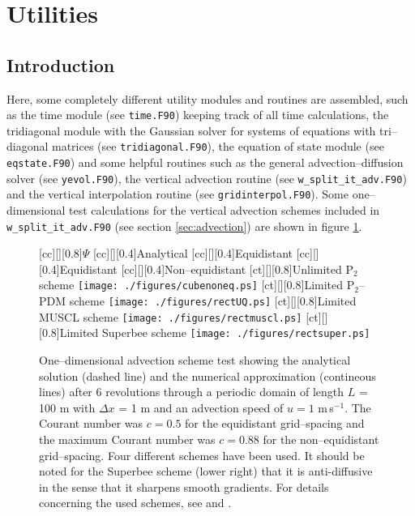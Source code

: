 %
%

\section{Utilities}\label{sec:util}

\subsection{Introduction}

Here, some completely different utility modules and
routines are assembled,
such as the time module (see {\tt time.F90}) keeping track of all 
time calculations,
the tridiagonal module with the Gaussian solver for systems of equations
with tri--diagonal matrices (see {\tt tridiagonal.F90}),
the equation of state module (see {\tt eqstate.F90}) and some 
helpful routines such as the general advection--diffusion solver
(see {\tt yevol.F90}), the vertical advection routine
(see {\tt w\_split\_it\_adv.F90}) and the vertical interpolation routine
(see {\tt gridinterpol.F90}). Some one--dimensional test calculations for
the vertical advection schemes included in
{\tt w\_split\_it\_adv.F90} (see section \ref{sec:advection})
are shown in figure \ref{OneDAdvection}.

\begin{figure}[h]
\begin{center}
[cc][][0.8]{$\Psi$}
[cc][][0.4]{Analytical}
[cc][][0.4]{Equidistant}
[cc][][0.4]{Equidistant}
[cc][][0.4]{Non--equidistant}
[ct][][0.8]{Unlimited P$_2$ scheme}
\texttt{[image: ./figures/cubenoneq.ps]}
[ct][][0.8]{Limited P$_2$--PDM scheme}
\texttt{[image: ./figures/rectUQ.ps]}
[ct][][0.8]{Limited MUSCL scheme}
\texttt{[image: ./figures/rectmuscl.ps]}
[ct][][0.8]{Limited Superbee scheme}
\texttt{[image: ./figures/rectsuper.ps]}
\caption{
One--dimensional advection scheme test showing the analytical solution
(dashed line) and the numerical approximation (contineous lines) after
6 revolutions through a periodic domain of length
$L$ = 100 m with $\Delta x$ = 1 m and an advection speed of
$u=1$ m\,s$^{-1}$. The Courant number was $c=0.5$ for the equidistant 
grid--spacing
and the maximum Courant number was $c=0.88$ 
for the non--equidistant grid--spacing.
Four different schemes have been used. It should be noted for the
Superbee scheme (lower right) that it is anti-diffusive
in the sense that it sharpens smooth gradients.
For details concerning the used schemes, see \cite{Pietrzak98}
and \cite{BurchardBolding2002}.
}\label{OneDAdvection}
\end{center}
\end{figure}


